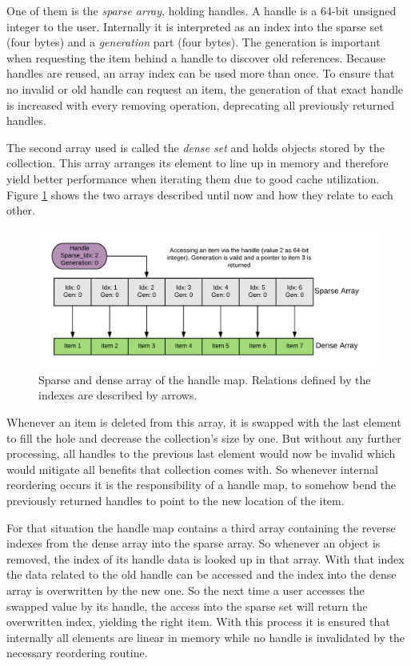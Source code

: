 One of them is the \textit{sparse array}, holding handles. A handle is a 64-bit unsigned integer to the user. Internally it is interpreted as an index into the sparse set (four bytes) and a \textit{generation} part (four bytes). The generation is important when requesting the item behind a handle to discover old references. Because handles are reused, an array index can be used more than once. To ensure that no invalid or old handle can request an item, the generation of that exact handle is increased with every removing operation, deprecating all previously returned handles. 

The second array used is called the \textit{dense set} and holds objects stored by the collection. This array arranges its element to line up in memory and therefore yield better performance when iterating them due to good cache utilization. Figure \ref{fig:handle_map} shows the two arrays described until now and how they relate to each other.

\begin{figure}[h!]
	\centering \includegraphics[width=\linewidth]{PICs/handle_map.png}
	\caption{Sparse and dense array of the handle map. Relations defined by the indexes are described by arrows.}
	\label{fig:handle_map}
\end{figure}

\noindent
Whenever an item is deleted from this array, it is swapped with the last element to fill the hole and decrease the collection's size by one. But without any further processing, all handles to the previous last element would now be invalid which would mitigate all benefits that collection comes with. So whenever internal reordering occurs it is the responsibility of a handle map, to somehow bend the previously returned handles to point to the new location of the item.

For that situation the handle map contains a third array containing the reverse indexes from the dense array into the sparse array. So whenever an object is removed, the index of its handle data is looked up in that array. With that index the data related to the old handle can be accessed and the index into the dense array is overwritten by the new one. So the next time a user accesses the swapped value by its handle, the access into the sparse set will return the overwritten index, yielding the right item. With this process it is ensured that internally all elements are linear in memory while no handle is invalidated by the necessary reordering routine. 

